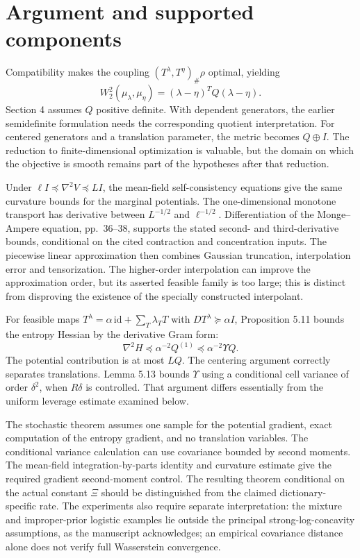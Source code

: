 \documentclass[10pt]{article}
\begin{document}
\section*{Argument and supported components}
Compatibility makes the coupling \((T^\lambda,T^\eta)_\#\rho\) optimal, yielding \[W_2^2(\mu_\lambda,\mu_\eta)
       =(\lambda-\eta)^TQ(\lambda-\eta).\] Section 4 assumes \(Q\) positive definite. With dependent generators, the earlier semidefinite formulation needs the corresponding quotient interpretation. For centered generators and a translation parameter, the metric becomes \(Q\oplus I\). The reduction to finite-dimensional optimization is valuable, but the domain on which the objective is smooth remains part of the hypotheses after that reduction.\par
Under \(\ell I\preceq\nabla^2V\preceq LI\), the mean-field self-consistency equations give the same curvature bounds for the marginal potentials. The one-dimensional monotone transport has derivative between \(L^{-1/2}\) and \(\ell^{-1/2}\). Differentiation of the Monge–Ampere equation, pp. 36–38, supports the stated second- and third-derivative bounds, conditional on the cited contraction and concentration inputs. The piecewise linear approximation then combines Gaussian truncation, interpolation error and tensorization. The higher-order interpolation can improve the approximation order, but its asserted feasible family is too large; this is distinct from disproving the existence of the specially constructed interpolant.\par
For feasible maps \(T^\lambda=\alpha\,\mathrm{id}+\sum_T\lambda_TT\) with \(DT^\lambda\succeq\alpha I\), Proposition 5.11 bounds the entropy Hessian by the derivative Gram form: \[\nabla^2 H\preceq\alpha^{-2}Q^{(1)}
       \preceq\alpha^{-2}\Upsilon Q.\] The potential contribution is at most \(LQ\). The centering argument correctly separates translations. Lemma 5.13 bounds \(\Upsilon\) using a conditional cell variance of order \(\delta^2\), when \(R\delta\) is controlled. That argument differs essentially from the uniform leverage estimate examined below.\par
The stochastic theorem assumes one sample for the potential gradient, exact computation of the entropy gradient, and no translation variables. The conditional variance calculation can use covariance bounded by second moments. The mean-field integration-by-parts identity and curvature estimate give the required gradient second-moment control. The resulting theorem conditional on the actual constant \(\Xi\) should be distinguished from the claimed dictionary-specific rate. The experiments also require separate interpretation: the mixture and improper-prior logistic examples lie outside the principal strong-log-concavity assumptions, as the manuscript acknowledges; an empirical covariance distance alone does not verify full Wasserstein convergence.\par
\end{document}
